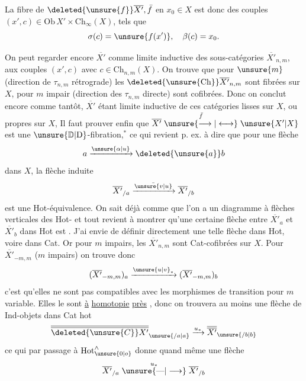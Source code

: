 La fibre de $\deleted{\unsure{f}}\overline{X'},\bar f$ en $x_0\in X$ est donc  des couples $(x',c)\in\mathrm{Ob}\,X'\times\mathrm{Ch}_{\infty}(X)$, tels que
\[
\sigma(c)=\unsure{f(x')},\quad\beta(c)=x_0.
\]

 On peut regarder encore $\overline{X'}$ comme limite inductive des sous-catégories $\overline{X'}_{n,m}$,  aux couples $(x',c)$ avec $c\in\mathrm{Ch}_{n,m}(X)$. On trouve que pour $\unsure{m}$  (direction  de $\tau_{n,m}$ rétrograde) les $\deleted{\unsure{\mathrm{Ch}}}\overline{X'}_{n,m}$ sont fibrées sur $X$, pour $m$ impair (direction  des $\tau_{n,m}$ directe)  sont cofibrées. Donc on conclut encore comme tantôt,  $\overline{X'}$ étant  limite inductive  de ces catégories lisses sur $X$, ou propres sur $X$,
Il faut prouver enfin que $\overline{X'}\mathrel{\overset{\bar f}{\unsure{\longrightarrow|\longleftrightarrow}}}\unsure{X'|X}$ est une $\unsure{\mathbb D|\mathrm D}$-fibration,$^{*}$ ce qui revient p. ex. à dire que pour une flèche
\[
a\xrightarrow{\unsure{\alpha|u}}\deleted{\unsure{a}}b
\]
dans $X$, la flèche induite
\[
\overline{X'}_{/a}\xrightarrow{\bar{\unsure{v|u}}}\overline{X'}_{/b}
\]
est une Hot-équivalence. On sait déjà comme  que l'on a un diagramme à flèches verticales des Hot-
et tout revient à montrer qu'une certaine flèche entre $\overline{X'}_a$ et $\overline{X'}_b$ dans Hot est .  J'ai envie de définir directement une telle flèche dans Hot, voire dans Cat. Or pour  $m$  impairs, les $\overline{X'}_{n,m}$ sont Cat-cofibrées sur $X$. Pour $\overline{X'}_{-m,m}$ ($m$ impairs) on trouve donc
\[
(\overline{X'}_{-m,m})_a\xrightarrow{\unsure{u|v}_*}(\overline{X'}_{-m,m})_b
\]
 c'est qu'elles ne sont pas compatibles avec les morphismes de transition pour $m$ variable. Elles le sont  \uline{à} \uline{homotopie} \uline{près} , donc on trouvera au moins une flèche de Ind-objets dans Cat hot
\[
\overline{\overline{\deleted{\unsure{C}}X'}}_{\unsure{/a|a}}\xrightarrow{u_*}
\overline{\overline{X'}}_{\unsure{/b|b}}
\]
ce qui par passage à $\mathrm{Hot}_{\unsure{0|o}}^{\wedge}$ donne quand même une flèche
\[
\overline{X'}_{/a}\mathrel{\overset{u_*}{\unsure{\text{---}|\longrightarrow}}}\overline{X'}_{/b}
\]

